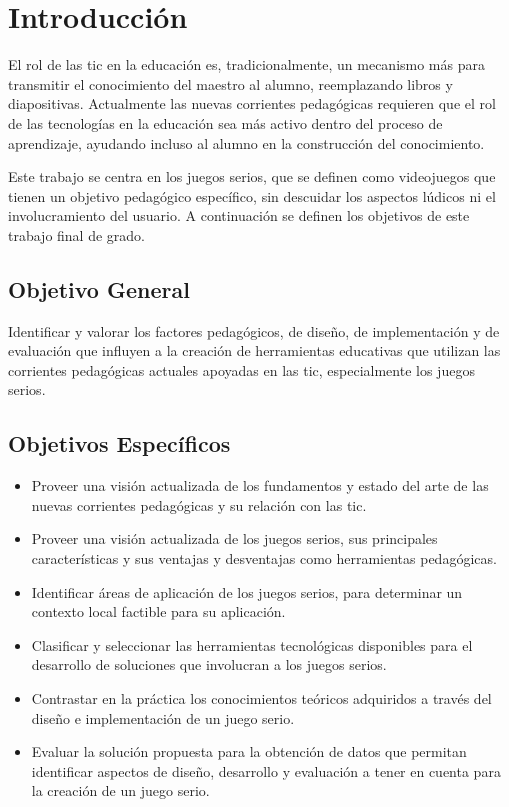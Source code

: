 
\section{Introducción}

El rol de las \gls{tic} en la educación es, tradicionalmente, un mecanismo más
para transmitir el conocimiento del maestro al alumno, reemplazando libros y
diapositivas\cite{laptop:instructionism}. Actualmente las nuevas corrientes
pedagógicas requieren que el rol de las tecnologías en la educación sea más
activo dentro del proceso de aprendizaje, ayudando incluso al alumno en la
construcción del conocimiento.

Este trabajo se centra en los juegos serios, que se definen como videojuegos que
tienen un objetivo pedagógico específico, sin descuidar los aspectos lúdicos ni
el involucramiento del usuario\cite{sg:aoverview,ludus:sg,abt1987serious}. A
continuación se definen los objetivos de este trabajo final de grado.

\subsection{Objetivo General}

Identificar y valorar los factores pedagógicos, de diseño, de implementación y
de evaluación que influyen a la creación de herramientas educativas que utilizan
las corrientes pedagógicas actuales apoyadas en las \gls{tic}, especialmente los
juegos serios.

\subsection{Objetivos Específicos}

\begin{itemize}

\item Proveer una visión actualizada de los fundamentos y estado del arte de las
    nuevas corrientes pedagógicas y su relación con las \gls{tic}.

\item Proveer una visión actualizada de los juegos serios, sus principales
    características y sus ventajas y desventajas como herramientas pedagógicas.

\item Identificar áreas de aplicación de los juegos serios, para determinar un
    contexto local factible para su aplicación.

\item Clasificar y seleccionar las herramientas tecnológicas disponibles para el
    desarrollo de soluciones que involucran a los juegos serios.

\item Contrastar en la práctica los conocimientos teóricos adquiridos a través
    del diseño e implementación de un juego serio.

\item Evaluar la solución propuesta para la obtención de datos que permitan
    identificar aspectos de diseño, desarrollo y evaluación a tener en cuenta
    para la creación de un juego serio.

\end{itemize}
